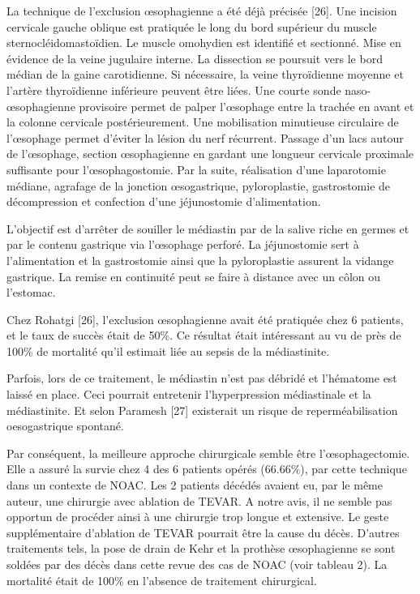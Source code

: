 \documentclass[./tfe.tex]{subfiles}
\begin{document}
La technique de l’exclusion œsophagienne a été déjà précisée [26]. Une incision cervicale gauche oblique est pratiquée le long du bord supérieur du muscle sternocléidomastoïdien. Le muscle omohydien est identifié et sectionné. Mise en évidence de la veine jugulaire interne. La dissection se poursuit vers le bord médian de la gaine carotidienne. Si nécessaire, la veine thyroïdienne moyenne et l’artère thyroïdienne inférieure peuvent être liées. Une courte sonde naso-œsophagienne provisoire permet de palper l’œsophage entre la trachée en avant et la colonne cervicale postérieurement. Une mobilisation minutieuse circulaire de l’œsophage permet d’éviter la lésion du nerf récurrent. Passage d’un lacs autour de l’œsophage, section œsophagienne en gardant une longueur cervicale proximale suffisante pour l’œsophagostomie. Par la suite, réalisation d’une laparotomie médiane, agrafage de la jonction œsogastrique, pyloroplastie, gastrostomie de décompression et confection d’une jéjunostomie d’alimentation.

L’objectif est d’arrêter de souiller le médiastin par de la salive riche en germes et par le contenu gastrique via l’œsophage perforé. La jéjunostomie sert à l’alimentation et la gastrostomie ainsi que la pyloroplastie assurent la vidange gastrique. La remise en continuité peut se faire à distance avec un côlon ou l’estomac.

Chez Rohatgi [26], l’exclusion œsophagienne avait été pratiquée chez 6 patients, et le taux de succès était de 50\%. Ce résultat était intéressant au vu de près de 100\% de mortalité qu’il estimait liée au sepsis de la médiastinite.

Parfois, lors de ce traitement, le médiastin n’est pas débridé et l’hématome est laissé en place. Ceci pourrait entretenir l’hyperpression médiastinale et la médiastinite. Et selon Paramesh [27] existerait un risque de reperméabilisation oesogastrique spontané.

Par conséquent, la meilleure approche chirurgicale semble être l’œsophagectomie. Elle a assuré la survie chez 4 des 6 patients opérés (66.66\%), par cette technique dans un contexte de NOAC. Les 2 patients décédés avaient eu, par le même auteur, une chirurgie avec ablation de TEVAR. A notre avis, il ne semble pas opportun de procéder ainsi à une chirurgie trop longue et extensive. Le geste supplémentaire d’ablation de TEVAR pourrait être la cause du décès.
D’autres traitements tels, la pose de drain de Kehr et la prothèse œsophagienne se sont soldées par des décès dans cette revue des cas de NOAC (voir tableau 2). La mortalité était de 100\% en l’absence de traitement chirurgical.
\end{document}
